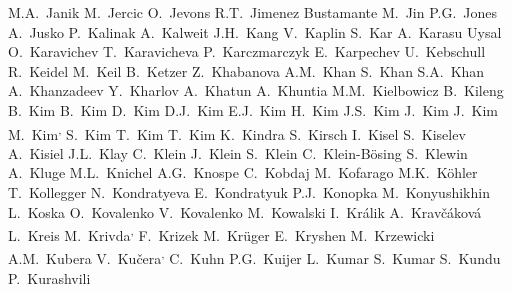 \begin{flushleft}
M.A.~Janik\And 
M.~Jercic\And 
O.~Jevons\And 
R.T.~Jimenez Bustamante\And 
M.~Jin\And 
P.G.~Jones\And 
A.~Jusko\And 
P.~Kalinak\And 
A.~Kalweit\And 
J.H.~Kang\And 
V.~Kaplin\And 
S.~Kar\And 
A.~Karasu Uysal\And 
O.~Karavichev\And 
T.~Karavicheva\And 
P.~Karczmarczyk\And 
E.~Karpechev\And 
U.~Kebschull\And 
R.~Keidel\And 
M.~Keil\And 
B.~Ketzer\And 
Z.~Khabanova\And 
A.M.~Khan\And 
S.~Khan\And 
S.A.~Khan\And 
A.~Khanzadeev\And 
Y.~Kharlov\And 
A.~Khatun\And 
A.~Khuntia\And 
M.M.~Kielbowicz\And 
B.~Kileng\And 
B.~Kim\And 
B.~Kim\And 
D.~Kim\And 
D.J.~Kim\And 
E.J.~Kim\And 
H.~Kim\And 
J.S.~Kim\And 
J.~Kim\And 
J.~Kim\And 
M.~Kim\textsuperscript{,}\And 
S.~Kim\And 
T.~Kim\And 
T.~Kim\And 
K.~Kindra\And 
S.~Kirsch\And 
I.~Kisel\And 
S.~Kiselev\And 
A.~Kisiel\And 
J.L.~Klay\And 
C.~Klein\And 
J.~Klein\And 
S.~Klein\And 
C.~Klein-B\"{o}sing\And 
S.~Klewin\And 
A.~Kluge\And 
M.L.~Knichel\And 
A.G.~Knospe\And 
C.~Kobdaj\And 
M.~Kofarago\And 
M.K.~K\"{o}hler\And 
T.~Kollegger\And 
N.~Kondratyeva\And 
E.~Kondratyuk\And 
P.J.~Konopka\And 
M.~Konyushikhin\And 
L.~Koska\And 
O.~Kovalenko\And 
V.~Kovalenko\And 
M.~Kowalski\And 
I.~Kr\'{a}lik\And 
A.~Krav\v{c}\'{a}kov\'{a}\And 
L.~Kreis\And 
M.~Krivda\textsuperscript{,}\And 
F.~Krizek\And 
M.~Kr\"uger\And 
E.~Kryshen\And 
M.~Krzewicki\And 
A.M.~Kubera\And 
V.~Ku\v{c}era\textsuperscript{,}\And 
C.~Kuhn\And 
P.G.~Kuijer\And 
L.~Kumar\And 
S.~Kumar\And 
S.~Kundu\And 
P.~Kurashvili\And 

\end{flushleft}
